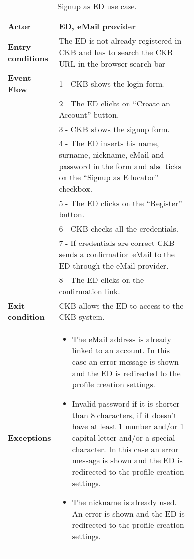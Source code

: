 \begin{center}
    \begin{longtable}{|l|p{0.75\linewidth}|}
        \hline
        \textbf{Actor}            & ED, eMail provider\\
        \hline
        \textbf{Entry conditions} & The ED is not already registered in CKB and has to search the CKB URL in the browser search bar \\
        \hline
        \textbf{Event Flow}       & 1 - CKB shows the login form.  \\
        & 2 - The ED clicks on “Create an Account” button.   \\
        & 3 - CKB shows the signup form.    \\
        & 4 - The ED inserts his name, surname, nickname, eMail and password in the form and also ticks on the “Signup as Educator” checkbox.  \\
        & 5 - The ED clicks on the “Register” button.  \\
        & 6 - CKB checks all the credentials.  \\
        & 7 - If credentials are correct CKB sends a confirmation eMail to the ED through the eMail provider.  \\
        & 8 - The ED clicks on the confirmation link.    \\
        \hline
        \textbf{Exit condition}   & CKB allows the ED to access to the CKB system. \\       
        \hline
        \textbf{Exceptions}       & \begin{itemize}
            \item The eMail address is already linked to an account. In this case an error message is shown and the ED is redirected to the profile creation settings.
            \item Invalid password if it is shorter than 8 characters, if it doesn’t have at least 1 number and/or 1 capital letter and/or a special character. In this case an error message is shown and the ED is redirected to the profile creation settings.
            \item  The nickname is already used. An error is shown and the ED is redirected to the profile creation settings.
        \end{itemize}\\
        \hline
        \caption{Signup as ED use case.}
        \label{tab: signup_as_ED_use_case}
    \end{longtable}
\end{center}

